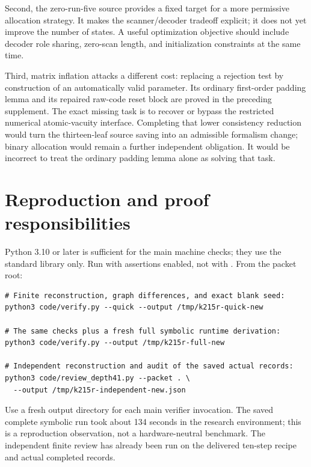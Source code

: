 \documentclass[11pt]{article}
\newcommand{\file}[1]{\texttt{\detokenize{#1}}}
\begin{document}
Second, the zero-run-five source provides a fixed target for a more
permissive allocation strategy. It makes the scanner/decoder tradeoff
explicit; it does not yet improve the number of states. A useful
optimization objective should include decoder role sharing, zero-scan
length, and initialization constraints at the same time.

Third, matrix inflation attacks a different cost: replacing a rejection
test by construction of an automatically valid parameter. Its ordinary
first-order padding lemma and its repaired raw-code reset block are
proved in the preceding supplement. The exact missing task is to
recover or bypass the restricted numerical atomic-vacuity interface.
Completing that lower consistency reduction would turn the thirteen-leaf
source saving into an admissible formalism change; binary allocation
would remain a further independent obligation. It would be incorrect
to treat the ordinary padding lemma alone as solving that task.

\section{Reproduction and proof responsibilities}

Python 3.10 or later is sufficient for the main machine checks; they use
the standard library only. Run with assertions enabled, not with
\file{python -O}. From the packet root:
\begin{lstlisting}
# Finite reconstruction, graph differences, and exact blank seed:
python3 code/verify.py --quick --output /tmp/k215r-quick-new

# The same checks plus a fresh full symbolic runtime derivation:
python3 code/verify.py --output /tmp/k215r-full-new

# Independent reconstruction and audit of the saved actual records:
python3 code/review_depth41.py --packet . \
  --output /tmp/k215r-independent-new.json
\end{lstlisting}
Use a fresh output directory for each main verifier invocation. The
saved complete symbolic run took about 134 seconds in the research
environment; this is a reproduction observation, not a hardware-neutral
benchmark. The independent finite review has already been run on the
delivered ten-step recipe and actual completed records.
\end{document}
